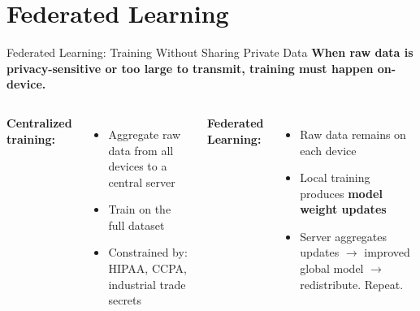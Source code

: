 \documentclass[aspectratio=169,11pt]{beamer}
\begin{document}
\section{Federated Learning}

\begin{frame}[shrink]{Federated Learning: Training Without Sharing Private Data}
    \small
    \textbf{When raw data is privacy-sensitive or too large to transmit, training must happen on-device.}

    \vspace{0.1cm}
    \begin{columns}
        \textbf{Centralized training:}
        \begin{itemize}\setlength{\itemsep}{6pt}
            \item Aggregate raw data from all devices to a central server
            \item Train on the full dataset
            \item Constrained by: HIPAA, CCPA, industrial trade secrets
        \end{itemize}

        \vspace{0.15cm}
        \textbf{Federated Learning:}
        \begin{itemize}\setlength{\itemsep}{6pt}
            \item Raw data remains on each device
            \item Local training produces \textbf{model weight updates}
            \item Server aggregates updates $\rightarrow$ improved global model $\rightarrow$ redistribute. Repeat.
        \end{itemize}


\end{columns}
\end{frame}
\end{document}
